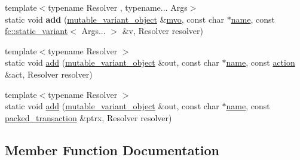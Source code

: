 \begin{DoxyCompactItemize}
\item 
\mbox{\label{structaacio_1_1chain_1_1contracts_1_1impl_1_1abi__to__variant_a8222c3402a4000ed9004f6643b43df64}} 
{\footnotesize template$<$typename Resolver , typename... Args$>$ }\\static void {\bfseries add} (\mbox{\hyperlink{classfc_1_1mutable__variant__object}{mutable\+\_\+variant\+\_\+object}} \&\mbox{\hyperlink{classfc_1_1mutable__variant__object}{mvo}}, const char $\ast$\mbox{\hyperlink{structaacio_1_1chain_1_1name}{name}}, const \mbox{\hyperlink{classfc_1_1static__variant}{fc\+::static\+\_\+variant}}$<$ Args... $>$ \&v, Resolver resolver)
\item 
{\footnotesize template$<$typename Resolver $>$ }\\static void \mbox{\hyperlink{structaacio_1_1chain_1_1contracts_1_1impl_1_1abi__to__variant_a12653d9043d4c955b43b3555d88a21e9}{add}} (\mbox{\hyperlink{classfc_1_1mutable__variant__object}{mutable\+\_\+variant\+\_\+object}} \&out, const char $\ast$\mbox{\hyperlink{structaacio_1_1chain_1_1name}{name}}, const \mbox{\hyperlink{structaacio_1_1chain_1_1action}{action}} \&act, Resolver resolver)
\item 
{\footnotesize template$<$typename Resolver $>$ }\\static void \mbox{\hyperlink{structaacio_1_1chain_1_1contracts_1_1impl_1_1abi__to__variant_abd5e736958193540eb91fc05c991509d}{add}} (\mbox{\hyperlink{classfc_1_1mutable__variant__object}{mutable\+\_\+variant\+\_\+object}} \&out, const char $\ast$\mbox{\hyperlink{structaacio_1_1chain_1_1name}{name}}, const \mbox{\hyperlink{structaacio_1_1chain_1_1packed__transaction}{packed\+\_\+transaction}} \&ptrx, Resolver resolver)
\end{DoxyCompactItemize}


\subsection{Member Function Documentation}
\mbox{\label{structaacio_1_1chain_1_1contracts_1_1impl_1_1abi__to__variant_a8da8deee98fad24fca317ec24b936316}} 
